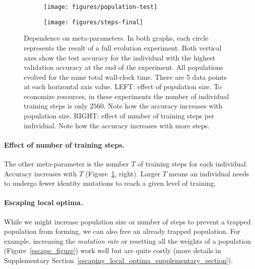 \documentclass{article}
\begin{document}
\begin{figure}
    \vskip 0.2in
    \begin{centering}
        \begin{subfigure}[b]{0.49\columnwidth}
            \begin{centering}
                \centerline{\texttt{[image: figures/population-test]}}
            \end{centering}
        \end{subfigure}
        \begin{subfigure}[b]{0.49\columnwidth}
            \begin{centering}
                \centerline{\texttt{[image: figures/steps-final]}}
            \end{centering}
        \end{subfigure}
        \caption{Dependence on meta-parameters. In both graphs, each circle represents the result of a full evolution experiment. Both vertical axes show the test accuracy for the individual with the highest validation accuracy at the end of the experiment. All populations evolved for the same total wall-clock time. There are 5 data points at each horizontal axis value. LEFT: effect of population size. To economize resources, in these experiments the number of individual training steps is only $2560$. Note how the accuracy increases with population size. RIGHT: effect of number of training steps per individual. Note how the accuracy increases with more steps.}
        \label{meta_parameters_figure}
    \end{centering}
    \vskip 0.2in
\end{figure}

\vspace{-1em}
\paragraph{Effect of number of training steps.} The other meta-parameter is the number $T$ of training steps for each individual. Accuracy increases with $T$ (Figure~\ref{meta_parameters_figure}, right). Larger $T$ means an individual needs to undergo fewer identity mutations to reach a given level of training.

\vspace{-1em}
\paragraph{Escaping local optima.} While we might increase population size or number of steps to prevent a trapped population from forming, we can also free an already trapped population. For example, increasing the {\em mutation rate} or resetting all the weights of a population (Figure~\ref{escape_figure}) work well but are quite costly (more details in Supplementary Section~\ref{escaping_local_optima_supplementary_section}).
\end{document}
